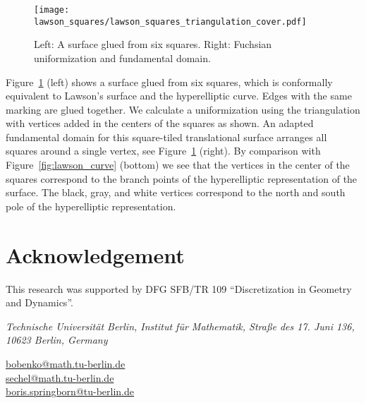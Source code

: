 \documentclass[Thesis]{subfiles}
\begin{document}

\begin{figure}
	\centering
	\resizebox{\textwidth}{!} {
	\texttt{[image: lawson\_squares/lawson\_squares\_triangulation\_cover.pdf]}
	}
	\caption{Left: A surface glued from six squares. Right:
          Fuchsian uniformization and fundamental domain.}
\label{fig:lawson_squares}
\end{figure}

Figure~\ref{fig:lawson_squares} (left) shows a surface glued from six
squares, which is conformally equivalent to Lawson's surface and the
hyperelliptic curve. Edges with the same marking are glued
together. We calculate a uniformization using the triangulation with
vertices added in the centers of the squares as shown. An adapted
fundamental domain for this square-tiled translational surface
arranges all squares around a single vertex, see
Figure~\ref{fig:lawson_squares} (right). By comparison with
Figure~\ref{fig:lawson_curve} (bottom) we see that the vertices in the
center of the squares correspond to the branch points of the
hyperelliptic representation of the surface. The black, gray, and
white vertices correspond to the north and south pole of the
hyperelliptic representation.

\section*{Acknowledgement}
This research was supported by DFG SFB/TR 109 ``Discretization in Geometry
and Dynamics''.

%



\bigskip\noindent%
\textit{Technische Universit{\"a}t Berlin, Institut f{\"u}r Mathematik, Stra{\ss}e des 17. Juni 136, 10623 Berlin, Germany}

\medskip\noindent%
\href{mailto:bobenko@math.tu-berlin.de}{bobenko@math.tu-berlin.de}\\
\href{mailto:sechel@math.tu-berlin.de}{sechel@math.tu-berlin.de}\\
\href{mailto:boris.springborn@tu-berlin.de}{boris.springborn@tu-berlin.de}
\end{document}
